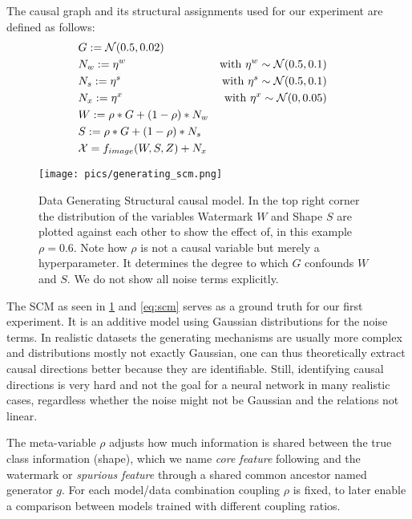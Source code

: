 The causal graph and its structural assignments used for our experiment are defined as follows: 
\begin{align}
&G:=\mathcal{N}(0.5,0.02) \notag \\ 
&N_w:=\eta^w &\mathrm{with} \  \eta^w \sim \mathcal{N}(0.5,0.1) && \notag \\ 
&N_s:=\eta^s &\mathrm{with} \  \eta^s \sim \mathcal{N}(0.5,0.1) && \notag \\ 
&N_x:=\eta^x &\mathrm{with} \  \eta^x \sim \mathcal{N}(0,0.05) && \notag \\ 
&W:=\rho * G + (1-\rho)* N_w \notag \\ 
&S:=\rho * G + (1-\rho)* N_s \notag \\ 
& \mathcal{X} = f_{image}(W, S, Z) + N_{x} &
\end{align}

\begin{figure}[H]
    \centering
    \texttt{[image: pics/generating\_scm.png]}
    \caption[Data Generating SCM]{Data Generating Structural causal model.
        In the top right corner the distribution of the variables Watermark $W$ and Shape $S$ are plotted against each other to show the effect of, in this example $\rho = 0.6$. Note how $\rho$ is not a causal variable but merely a hyperparameter. It determines the degree to which $G$ confounds $W$ and $S$. We do not show all noise terms explicitly.}
    \label{fig:generating_scm}
\end{figure}

The SCM as seen in \cref{fig:generating_scm} and \cref{eq:scm} serves as a ground truth for our first experiment. It is an additive model using Gaussian distributions for the noise terms. In realistic datasets the generating mechanisms are usually more complex and distributions mostly not exactly Gaussian, one can thus theoretically extract causal directions better because they are identifiable.
Still, identifying causal directions is very hard and not the goal for a neural network in many realistic cases, regardless whether the noise might not be Gaussian and the relations not linear.

The meta-variable $\rho$ adjusts how much information is shared between the true class information (shape), which we name \textit{core feature} following \cite{Singla2022} and the watermark or \textit{spurious feature} through a shared common ancestor named generator $g$. For each model/data combination coupling $\rho$ is fixed, to later enable a comparison between models trained with different coupling ratios. 

